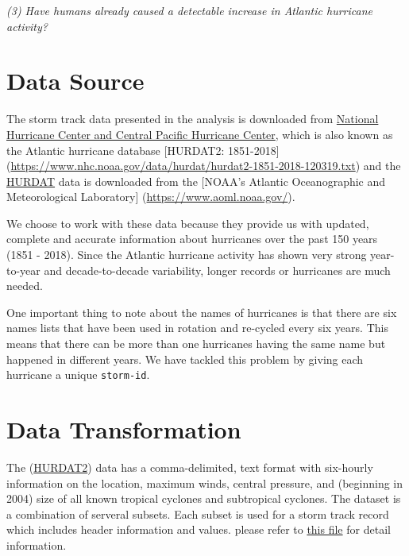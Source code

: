 \documentclass[]{book}
\begin{document}
\emph{(3) Have humans already caused a detectable increase in Atlantic hurricane activity?}

\hypertarget{datasource}{%
\chapter{Data Source}\label{datasource}}

The storm track data presented in the analysis is downloaded from \href{https://www.nhc.noaa.gov/data/\#hurdat}{National Hurricane Center and Central Pacific Hurricane Center}, which is also known as the Atlantic hurricane database {[}HURDAT2: 1851-2018{]} (\url{https://www.nhc.noaa.gov/data/hurdat/hurdat2-1851-2018-120319.txt}) and the \href{https://www.aoml.noaa.gov/hrd/hurdat/comparison_table.html}{HURDAT} data is downloaded from the {[}NOAA's Atlantic Oceanographic and Meteorological Laboratory{]} (\url{https://www.aoml.noaa.gov/}).

We choose to work with these data because they provide us with updated, complete and accurate information about hurricanes over the past 150 years (1851 - 2018). Since the Atlantic hurricane activity has shown very strong year-to-year and decade-to-decade variability, longer records or hurricanes are much needed.

One important thing to note about the names of hurricanes is that there are six names lists that have been used in rotation and re-cycled every six years. This means that there can be more than one hurricanes having the same name but happened in different years. We have tackled this problem by giving each hurricane a unique \texttt{storm-id}.

\hypertarget{datatrans}{%
\chapter{Data Transformation}\label{datatrans}}

The (\href{https://www.nhc.noaa.gov/data/hurdat/hurdat2-format-atlantic.pdf}{HURDAT2}) data has a comma-delimited, text format with six-hourly information on the location, maximum winds, central pressure, and (beginning in 2004) size of all known tropical cyclones and subtropical cyclones. The dataset is a combination of serveral subsets. Each subset is used for a storm track record which includes header information and values.
please refer to \href{https://www.nhc.noaa.gov/data/hurdat/hurdat2-format-atlantic.pdf}{this file} for detail information.
\end{document}
